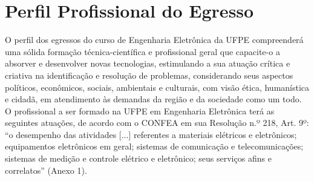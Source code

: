 \chapter{Perfil Profissional do Egresso}
\label{cap5}

O perfil dos egressos do curso de Engenharia Eletrônica da UFPE compreenderá uma sólida formação técnica-científica e profissional geral que capacite-o a absorver e desenvolver novas tecnologias, estimulando a sua atuação crítica e criativa na identificação e resolução de problemas, considerando seus aspectos políticos, econômicos, sociais, ambientais e culturais, com visão ética, humanística e cidadã, em atendimento às demandas da região e da sociedade como um todo. O profissional a ser formado na UFPE em Engenharia Eletrônica terá as seguintes atuações, de acordo com o CONFEA em sua Resolução n.º 218, Art. 9º: “o desempenho das atividades [...] referentes a materiais elétricos e eletrônicos; equipamentos eletrônicos em geral; sistemas de comunicação e telecomunicações; sistemas de medição e controle elétrico e eletrônico; seus serviços afins e correlatos” (Anexo 1).
